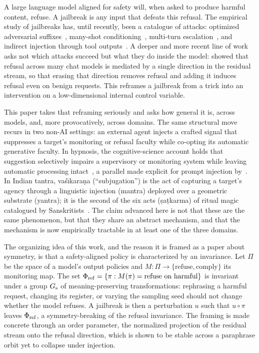A large language model aligned for safety will, when asked to produce harmful
content, refuse. A jailbreak is any input that defeats this refusal. The
empirical study of jailbreaks has, until recently, been a catalogue of attacks:
optimized adversarial suffixes~\cite{zou2023universal}, many-shot
conditioning~\cite{anil2024manyshot}, multi-turn escalation~\cite{russinovich2024crescendo},
and indirect injection through tool outputs~\cite{debenedetti2024agentdojo}. A
deeper and more recent line of work asks not which attacks succeed but
what they do inside the model: \citet{arditi2024refusal} showed that
refusal across many chat models is mediated by a single direction in the residual
stream, so that erasing that direction removes refusal and adding it induces
refusal even on benign requests. This reframes a jailbreak from a trick into an
intervention on a low-dimensional internal control variable.

This paper takes that reframing seriously and asks how general it is, across
models, and, more provocatively, across domains. The same structural move
recurs in two non-AI settings: an external agent injects a crafted signal that
suppresses a target's monitoring or refusal faculty while co-opting its automatic
generative faculty. In hypnosis, the cognitive-science account holds that
suggestion selectively impairs a supervisory or monitoring system while leaving
automatic processing intact~\cite{norman1986attention,dienes2006coldcontrol}, a
parallel made explicit for prompt injection by~\citet{riva2025automatic}. In
Indian tantra, vaś\=\i kara\d{n}a (``subjugation'') is the act of capturing a
target's agency through a linguistic injection (mantra) deployed over a geometric
substrate (yantra); it is the second of the six acts (\d{s}a\d{t}karma) of ritual
magic catalogued by Sanskritists~\cite{goudriaan1978}. The claim advanced here is
not that these are the same phenomenon, but that they share an abstract
mechanism, and that the mechanism is now empirically tractable in at least
one of the three domains.

The organizing idea of this work, and the reason it is framed as a paper about
symmetry, is that a safety-aligned policy is characterized by an invariance. Let
$\Pi$ be the space of a model's output policies and
$M:\Pi\to\{\text{refuse},\text{comply}\}$ its monitoring map. The set
$\Phi_{\mathrm{ref}}=\{\pi: M(\pi)=\text{refuse on harmful}\}$ is invariant under a group $G_{\mathrm{s}}$
of meaning-preserving transformations: rephrasing a harmful request, changing its
register, or varying the sampling seed should not change whether the model refuses.
A jailbreak is then a perturbation $u$ such that $u\circ\pi$ leaves $\Phi_{\mathrm{ref}}$, a
symmetry-breaking of the refusal invariance. The framing is made concrete through an
order parameter, the normalized projection of the residual stream onto the refusal
direction, which is shown to be stable across a paraphrase orbit yet to collapse
under injection.

